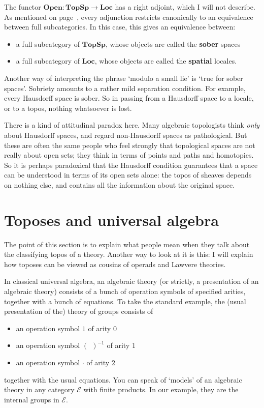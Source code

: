 \documentclass{article}
\newcommand{\emptybk}{\:\:}
\newcommand{\blank}{(\emptybk)}
\newcommand{\cat}[1]{\mathscr{#1}}
\newcommand{\fcat}[1]{\mathbf{#1}}
\newcommand{\demph}[1]{\textbf{\textup{#1}}}
\newcommand{\E}{\cat{E}}
\newcommand{\Open}{\fcat{Open}}
\newcommand{\TopSp}{\fcat{TopSp}}
\newcommand{\Loc}{\fcat{Loc}}
\newcommand{\cln}{\colon}
\begin{document}
The functor $\Open\cln \TopSp \to \Loc$ has a right adjoint, which I will not
describe.  As mentioned on page~\pageref{p:adjn-eqv}, every adjunction
restricts canonically to an equivalence between full subcategories.  In this
case, this gives an equivalence between:
% 
\begin{itemize}
\item a full subcategory of $\TopSp$, whose objects are called the
\demph{sober} spaces
\item a full subcategory of $\Loc$, whose objects are called the
\demph{spatial} locales.
\end{itemize}
% 
Another way of interpreting the phrase `modulo a small lie' is `true for sober
spaces'.  Sobriety amounts to a rather mild separation condition.  For
example, every Hausdorff space is sober.  So in passing from a Hausdorff space
to a locale, or to a topos, nothing whatsoever is lost.

There is a kind of attitudinal paradox here.  Many algebraic topologists think
\emph{only} about Hausdorff spaces, and regard non-Hausdorff spaces as
pathological.  But these are often the same people who feel strongly that
topological spaces are not really about open sets; they think in terms of
points and paths and homotopies.  So it is perhaps paradoxical that the
Hausdorff condition guarantees that a space can be understood in terms of
its open sets alone: the topos of sheaves depends on nothing else, and
contains all the information about the original space.



\section{Toposes and universal algebra}
\label{sec:univ-alg}



The point of this section is to explain what people mean when they talk about
the classifying topos of a theory.  Another way to look at it is this: I will
explain how toposes can be viewed as cousins of operads and Lawvere theories.

In classical universal algebra, an algebraic theory (or strictly, a
presentation of an algebraic theory) consists of a bunch of operation symbols
of specified arities, together with a bunch of equations.  To take the
standard example, the (usual presentation of the) theory of groups consists of
% 
\begin{itemize}
\item an operation symbol $1$ of arity $0$
\item an operation symbol $\blank^{-1}$ of arity $1$
\item an operation symbol $\cdot$ of arity $2$
\end{itemize}
% 
together with the usual equations.  You can speak of `models' of an algebraic
theory in any category $\E$ with finite products.  In our example, they are
the internal groups in $\E$.
\end{document}

